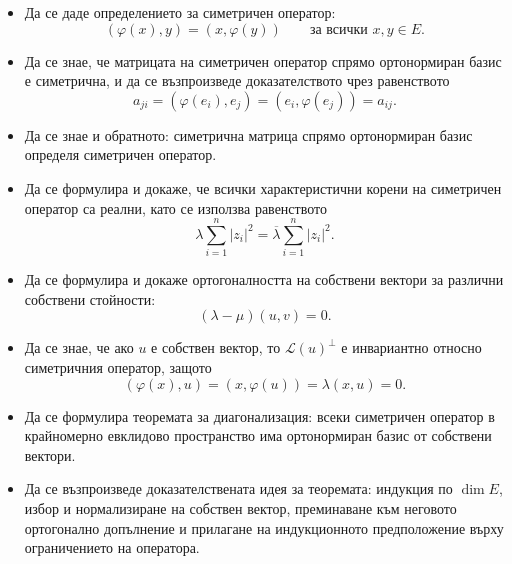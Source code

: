 \begin{itemize}
\item Да се даде определението за симетричен оператор:
\[
(\varphi(x),y)=(x,\varphi(y))
\qquad
\text{за всички }x,y\in E.
\]

\item Да се знае, че матрицата на симетричен оператор спрямо ортонормиран базис е симетрична, и да се възпроизведе доказателството чрез равенството
\[
a_{ji}=(\varphi(e_i),e_j)=(e_i,\varphi(e_j))=a_{ij}.
\]

\item Да се знае и обратното: симетрична матрица спрямо ортонормиран базис определя симетричен оператор.

\item Да се формулира и докаже, че всички характеристични корени на симетричен оператор са реални, като се използва равенството
\[
\lambda\sum_{i=1}^n|z_i|^2
=
\overline{\lambda}\sum_{i=1}^n|z_i|^2.
\]

\item Да се формулира и докаже ортогоналността на собствени вектори за различни собствени стойности:
\[
(\lambda-\mu)(u,v)=0.
\]

\item Да се знае, че ако $u$ е собствен вектор, то $\mathcal{L}(u)^\perp$ е инвариантно относно симетричния оператор, защото
\[
(\varphi(x),u)=(x,\varphi(u))=\lambda(x,u)=0.
\]

\item Да се формулира теоремата за диагонализация: всеки симетричен оператор в крайномерно евклидово пространство има ортонормиран базис от собствени вектори.

\item Да се възпроизведе доказателствената идея за теоремата: индукция по $\dim E$, избор и нормализиране на собствен вектор, преминаване към неговото ортогонално допълнение и прилагане на индукционното предположение върху ограничението на оператора.
\end{itemize}
